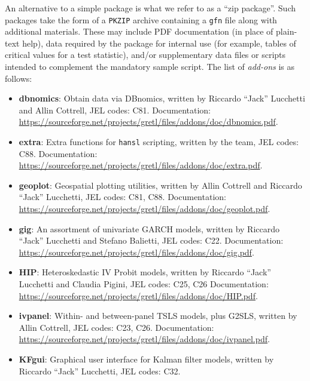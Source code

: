 An alternative to a simple package is what we refer to as a
``zip package''. Such packages take the form of a \texttt{PKZIP}
archive containing a \texttt{gfn} file along with additional
materials. These may include PDF documentation (in place of
plain-text help), data required by the package for internal
use (for example, tables of critical values for a test statistic),
and/or supplementary data files or scripts intended to complement
the mandatory sample script. The list of \textit{add-ons} is as follows:
\begin{itemize}
	\item \textbf{dbnomics}: Obtain data via DBnomics, written by
		Riccardo ``Jack'' Lucchetti and Allin Cottrell, JEL codes: C81.\newline
		Documentation: \url{https://sourceforge.net/projects/gretl/files/addons/doc/dbnomics.pdf}.	
	\item \textbf{extra}: Extra functions for \texttt{hansl} scripting,
		written by the \gretl team, JEL codes: C88.\newline
		Documentation: \url{https://sourceforge.net/projects/gretl/files/addons/doc/extra.pdf}.	
	\item \textbf{geoplot}: Geospatial plotting utilities,
		written by Allin Cottrell and Riccardo ``Jack'' Lucchetti,
		JEL codes: C81, C88.\newline
		Documentation: \url{https://sourceforge.net/projects/gretl/files/addons/doc/geoplot.pdf}.	
	\item \textbf{gig}: An assortment of univariate GARCH models,
		written by Riccardo ``Jack'' Lucchetti and Stefano Balietti,
		JEL codes: C22.\newline
		Documentation: \url{https://sourceforge.net/projects/gretl/files/addons/doc/gig.pdf}.	
	\item \textbf{HIP}: Heteroskedastic IV Probit models,
		written by Riccardo ``Jack'' Lucchetti and Claudia Pigini,
		JEL codes: C25, C26\newline
		Documentation: \url{https://sourceforge.net/projects/gretl/files/addons/doc/HIP.pdf}.	
	\item \textbf{ivpanel}: Within- and between-panel TSLS models,
		plus G2SLS, written by Allin Cottrell, JEL codes: C23, C26.\newline
		Documentation: \url{https://sourceforge.net/projects/gretl/files/addons/doc/ivpanel.pdf}.	
	\item \textbf{KFgui}: Graphical user interface for Kalman filter
		models, written by Riccardo ``Jack'' Lucchetti, JEL codes: C32.\newline

\end{itemize}
